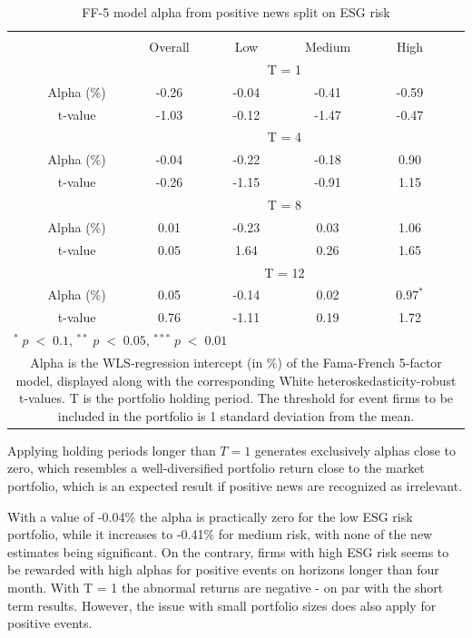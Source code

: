 \setlength{\tabcolsep}{15pt}
\begin{table}[H]
\small
\centering
\caption{FF-5 model alpha from positive news split on ESG risk} 
\begin{tabular}{ccccccc}
\hline \hline \\  
 &     & Overall  &    Low  &  Medium  &  High  &  \\ \cline{3-6} 
& & \multicolumn{4}{c}{ T = 1} & \\ \cline{2-6}
& Alpha (\%)  & -0.26 & -0.04  & -0.41  & -0.59 &  \\
& t-value & -1.03 & -0.12 & -1.47  & -0.47 & \\
& &  \multicolumn{4}{c}{ T = 4} & \\ \cline{2-6}
& Alpha (\%)  & -0.04 & -0.22  & -0.18  &  0.90 & \\
& t-value & -0.26 & -1.15 & -0.91  & 1.15 & \\
& &  \multicolumn{4}{c}{ T = 8} & \\ \cline{2-6}
& Alpha (\%)  & 0.01 & -0.23   & 0.03  & 1.06 &  \\
& t-value & 0.05 & 1.64  & 0.26 & 1.65 & \\
&  &  \multicolumn{4}{c}{ T = 12} & \\ \cline{2-6}
& Alpha (\%)  & 0.05 & -0.14  & 0.02  & $0.97^{*}$ &  \\
& t-value & 0.76 & -1.11  & 0.19 & 1.72 & \\
\hline \hline
 \multicolumn{7}{l}{ \footnotesize $^* \; p\; <\; 0.1$, $ ^{**} \; p\; <\; 0.05$, $ ^{***} \; p\; <\; 0.01$  } \\
 \multicolumn{7}{p{12cm}}{ \footnotesize Alpha is the WLS-regression intercept (in \%) of the Fama-French 5-factor model, displayed along with the corresponding White heteroskedasticity-robust t-values. T is the portfolio holding period. The threshold for event firms to be included in the portfolio is 1 standard deviation from the mean.}  \\ 
\end{tabular}
\label{tab: FF5_pos_ESG}
\end{table}

Applying holding periods longer than $T=1$ generates exclusively alphas close to zero, which resembles a well-diversified portfolio return close to the market portfolio, which is an expected result if positive news are recognized as irrelevant. 

With a value of -0.04\% the alpha is practically zero for the low ESG risk portfolio, while it increases to -0.41\% for medium risk, with none of the new estimates being significant. On the contrary, firms with high ESG risk seems to be rewarded with high alphas for positive events on horizons longer than four month. With T = 1 the abnormal returns are negative - on par with the short term results. However, the issue with small portfolio sizes does also apply for positive events.   

